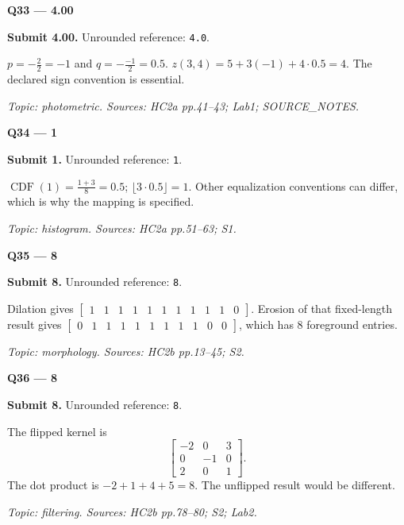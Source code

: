 \documentclass[11pt,a4paper]{article}
\begin{document}
\par\vspace{12pt}
\begin{minipage}{\linewidth}
\textbf{Q33 — 4.00}\par\smallskip
\textbf{Submit 4.00.} Unrounded reference: \texttt{4.0}.\par
\(p=-\frac{2}{2}=-1\) and \(q=-\frac{-1}{2}=0.5\). \(z(3,4)=5+3(-1)+4\cdot0.5=4\). The declared sign convention is essential.\par
{\small\itshape Topic: photometric. Sources: HC2a pp.41–43; Lab1; SOURCE\_\allowbreak{}NOTES.}

\end{minipage}
\par\vspace{12pt}
\begin{minipage}{\linewidth}
\textbf{Q34 — 1}\par\smallskip
\textbf{Submit 1.} Unrounded reference: \texttt{1}.\par
\(\operatorname{CDF}(1)=\frac{1+3}{8}=0.5\); \(\lfloor3\cdot0.5\rfloor=1\). Other equalization conventions can differ,\allowbreak{} which is why the mapping is specified.\par
{\small\itshape Topic: histogram. Sources: HC2a pp.51–63; S1.}

\end{minipage}
\par\vspace{12pt}
\begin{minipage}{\linewidth}
\textbf{Q35 — 8}\par\smallskip
\textbf{Submit 8.} Unrounded reference: \texttt{8}.\par
Dilation gives \(\begin{bmatrix}1&1&1&1&1&1&1&1&1&1&0\end{bmatrix}\). Erosion of that fixed-length result gives \(\begin{bmatrix}0&1&1&1&1&1&1&1&1&0&0\end{bmatrix}\),\allowbreak{} which has 8 foreground entries.\par
{\small\itshape Topic: morphology. Sources: HC2b pp.13–45; S2.}

\end{minipage}
\par\vspace{12pt}
\begin{minipage}{\linewidth}
\textbf{Q36 — 8}\par\smallskip
\textbf{Submit 8.} Unrounded reference: \texttt{8}.\par
The flipped kernel is
\[\begin{bmatrix}-2&0&3\\0&-1&0\\2&0&1\end{bmatrix}.\]
 The dot product is \(-2+1+4+5=8\). The unflipped result would be different.\par
{\small\itshape Topic: filtering. Sources: HC2b pp.78–80; S2; Lab2.}

\end{minipage}
\end{document}
